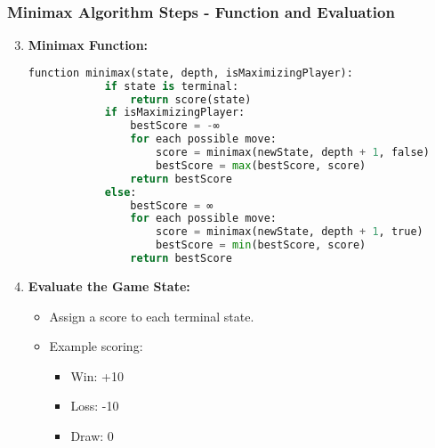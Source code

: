 \documentclass[aspectratio=169]{beamer}
\begin{document}
\begin{frame}[fragile]
    \frametitle{Minimax Algorithm Steps - Function and Evaluation}
    \begin{enumerate}
        \setcounter{enumi}{2}
        \item \textbf{Minimax Function:}
        \begin{lstlisting}[language=Python]
        function minimax(state, depth, isMaximizingPlayer):
            if state is terminal:
                return score(state)
            if isMaximizingPlayer:
                bestScore = -∞
                for each possible move:
                    score = minimax(newState, depth + 1, false)
                    bestScore = max(bestScore, score)
                return bestScore
            else:
                bestScore = ∞
                for each possible move:
                    score = minimax(newState, depth + 1, true)
                    bestScore = min(bestScore, score)
                return bestScore
        \end{lstlisting}
        
        \item \textbf{Evaluate the Game State:}
        \begin{itemize}
            \item Assign a score to each terminal state.
            \item Example scoring:
            \begin{itemize}
                \item Win: +10
                \item Loss: -10
                \item Draw: 0
            \end{itemize}
        \end{itemize}
    \end{enumerate}
\end{frame}
\end{document}
